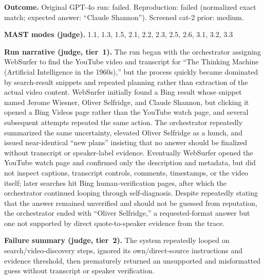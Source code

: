 \textbf{Outcome.} Original GPT-4o run: failed. Reproduction: failed (normalized exact match; expected answer: ``Claude Shannon''). Screened cat-2 prior: medium.

\textbf{MAST modes (judge).} 1.1, 1.3, 1.5, 2.1, 2.2, 2.3, 2.5, 2.6, 3.1, 3.2, 3.3

\textbf{Run narrative (judge, tier~1).} The run began with the orchestrator assigning WebSurfer to find the YouTube video and transcript for ``The Thinking Machine (Artificial Intelligence in the 1960s),'' but the process quickly became dominated by search-result snippets and repeated planning rather than extraction of the actual video content. WebSurfer initially found a Bing result whose snippet named Jerome Wiesner, Oliver Selfridge, and Claude Shannon, but clicking it opened a Bing Videos page rather than the YouTube watch page, and several subsequent attempts repeated the same action. The orchestrator repeatedly summarized the same uncertainty, elevated Oliver Selfridge as a hunch, and issued near-identical ``new plans'' insisting that no answer should be finalized without transcript or speaker-label evidence. Eventually WebSurfer opened the YouTube watch page and confirmed only the description and metadata, but did not inspect captions, transcript controls, comments, timestamps, or the video itself; later searches hit Bing human-verification pages, after which the orchestrator continued looping through self-diagnosis. Despite repeatedly stating that the answer remained unverified and should not be guessed from reputation, the orchestrator ended with ``Oliver Selfridge,'' a requested-format answer but one not supported by direct quote-to-speaker evidence from the trace.

\textbf{Failure summary (judge, tier~2).} The system repeatedly looped on search/video-discovery steps, ignored its own/direct-source instructions and evidence threshold, then prematurely returned an unsupported and misformatted guess without transcript or speaker verification.

